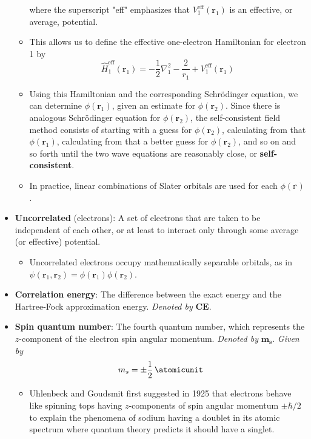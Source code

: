 \documentclass[../notes.tex]{subfiles}
\begin{document}
\begin{itemize}
\begin{itemize}
\begin{equation*}
        \end{equation*}
        where the superscript "eff" emphasizes that $V_1^\text{eff}(\mathbf{r}_1)$ is an effective, or average, potential.
        \item This allows us to define the effective one-electron Hamiltonian for electron 1 by
        \begin{equation*}
            \hat{H}_1^\text{eff}(\mathbf{r}_1) = -\frac{1}{2}\nabla_1^2-\frac{2}{r_1}+V_1^\text{eff}(\mathbf{r}_1)
        \end{equation*}
        \item Using this Hamiltonian and the corresponding Schr\"{o}dinger equation, we can determine $\phi(\mathbf{r}_1)$, given an estimate for $\phi(\mathbf{r}_2)$. Since there is analogous Schr\"{o}dinger equation for $\phi(\mathbf{r}_2)$, the self-consistent field method consists of starting with a guess for $\phi(\mathbf{r}_2)$, calculating from that $\phi(\mathbf{r}_1)$, calculating from that a better guess for $\phi(\mathbf{r}_2)$, and so on and so forth until the two wave equations are reasonably close, or \textbf{self-consistent}.
        \item In practice, linear combinations of Slater orbitals are used for each $\phi(\mathbb{r})$.
    \end{itemize}
    \item \textbf{Uncorrelated} (electrons): A set of electrons that are taken to be independent of each other, or at least to interact only through some average (or effective) potential.
    \begin{itemize}
        \item Uncorrelated electrons occupy mathematically separable orbitals, as in $\psi(\mathbf{r}_1,\mathbf{r}_2)=\phi(\mathbf{r}_1)\phi(\mathbf{r}_2)$.
    \end{itemize}
    \item \textbf{Correlation energy}: The difference between the exact energy and the Hartree-Fock approximation energy. \emph{Denoted by} $\textbf{CE}$.
    \item \textbf{Spin quantum number}: The fourth quantum number, which represents the $z$-component of the electron spin angular momentum. \emph{Denoted by} $\bm{m_s}$. \emph{Given by}
    \begin{equation*}
        m_s = \pm\frac{1}{2}\,\si{\atomicunit}
    \end{equation*}
    \begin{itemize}
        \item Uhlenbeck and Goudsmit first suggested in 1925 that electrons behave like spinning tops having $z$-components of spin angular momentum $\pm\hbar/2$ to explain the phenomena of sodium having a doublet in its atomic spectrum where quantum theory predicts it should have a singlet.

\end{itemize}
\end{itemize}
\end{document}
